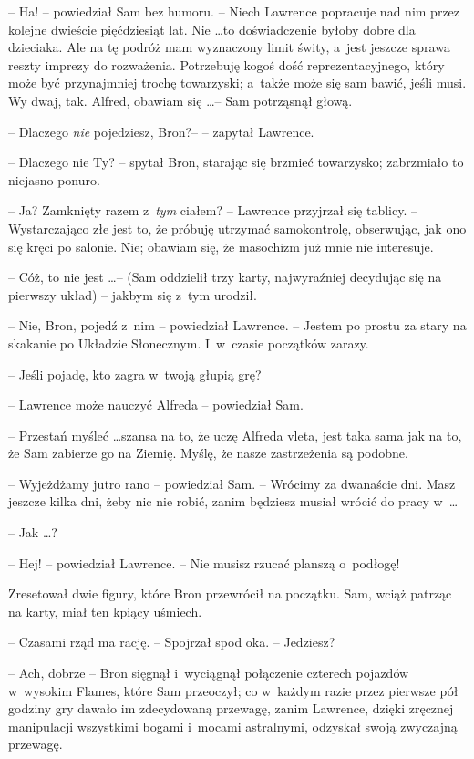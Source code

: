\documentclass[oneside,polish,11pt,rmheadings]{mwbk}
\begin{document}
-- Ha! -- powiedział Sam bez humoru. -- Niech Lawrence popracuje nad nim przez kolejne dwieście pięćdziesiąt lat. Nie \ldots  to doświadczenie byłoby dobre dla dzieciaka. Ale na tę podróż mam wyznaczony limit świty, a~jest jeszcze sprawa reszty imprezy do rozważenia. Potrzebuję kogoś dość reprezentacyjnego, który może być przynajmniej trochę towarzyski; a~także może się sam bawić, jeśli musi. Wy dwaj, tak. Alfred, obawiam się \ldots  -- Sam potrząsnął głową. 

-- Dlaczego \textit{nie } pojedziesz, Bron?-- -- zapytał Lawrence. 

-- Dlaczego nie Ty? -- spytał Bron, starając się brzmieć towarzysko; zabrzmiało to niejasno ponuro. 

-- Ja? Zamknięty razem z~\textit{tym }ciałem? -- Lawrence przyjrzał się tablicy. -- Wystarczająco złe jest to, że próbuję utrzymać samokontrolę, obserwując, jak ono się kręci po salonie. Nie; obawiam się, że masochizm już mnie nie interesuje. 

-- Cóż, to nie jest \ldots  --  (Sam oddzielił trzy karty, najwyraźniej decydując się na pierwszy układ) -- jakbym się z~tym urodził. 

-- Nie, Bron, pojedź z~nim -- powiedział Lawrence. -- Jestem po prostu za stary na skakanie po Układzie Słonecznym. I~w~czasie początków zarazy. 

-- Jeśli pojadę, kto zagra w~twoją głupią grę?

-- Lawrence może nauczyć Alfreda -- powiedział Sam. 

-- Przestań myśleć \ldots  szansa na to, że uczę Alfreda vleta, jest taka sama jak na to, że Sam zabierze go na Ziemię. Myślę, że nasze zastrzeżenia są podobne. 

-- Wyjeżdżamy jutro rano -- powiedział Sam.  -- Wrócimy za dwanaście dni. Masz jeszcze kilka dni, żeby nic nie robić, zanim będziesz musiał wrócić do pracy w~\ldots  

-- Jak \ldots ?  

-- Hej! -- powiedział Lawrence. -- Nie musisz rzucać planszą o~podłogę! 

Zresetował dwie figury, które Bron przewrócił na początku.  Sam, wciąż patrząc na karty, miał ten kpiący uśmiech.

-- Czasami rząd ma rację. -- Spojrzał spod oka. -- Jedziesz?  

-- Ach, dobrze -- Bron sięgnął i~wyciągnął połączenie czterech pojazdów w~wysokim Flames, które Sam przeoczył; co w~każdym razie przez pierwsze pół godziny gry dawało im zdecydowaną przewagę, zanim Lawrence, dzięki zręcznej manipulacji wszystkimi bogami i~mocami astralnymi, odzyskał swoją zwyczajną przewagę. 
\end{document}
